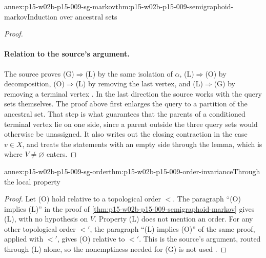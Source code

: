 \begin{annexitem}{annex:p15-w02b-p15-009-sg-markov}{thm:p15-w02b-p15-009-semigraphoid-markov}{Induction over ancestral sets}
\begin{proof}
\paragraph{Relation to the source's argument.}
The source proves (G)\(\Rightarrow\)(L) by the same isolation of
\(\alpha\), (L)\(\Rightarrow\)(O) by decomposition, (O)\(\Rightarrow\)(L)
by removing the last vertex, and (L)\(\Rightarrow\)(G) by removing a
terminal vertex \cite[Theorem~2.44 and its proof, pp.~65--66]{Lauritzen2019GraphicalLectures2020}.
In the last direction the source works with the query sets themselves.
The proof above first enlarges the query to a partition of the ancestral
set. That step is what guarantees that the parents of a conditioned
terminal vertex lie on one side, since a parent outside the three query
sets would otherwise be unassigned. It also writes out the closing
contraction in the case \(v\in X\), and treats the statements with an
empty side through the lemma, which is where \(V\neq\varnothing\) enters.
\end{proof}
\end{annexitem}

\begin{annexitem}{annex:p15-w02b-p15-009-sg-order}{thm:p15-w02b-p15-009-order-invariance}{Through the local property}
\begin{proof}
Let (O) hold relative to a topological order \(<\). The paragraph
``(O) implies (L)'' in the proof of
\cref{thm:p15-w02b-p15-009-semigraphoid-markov} gives (L), with no
hypothesis on \(V\). Property (L) does not mention an order. For any
other topological order \(<'\), the paragraph ``(L) implies (O)'' of
the same proof, applied with \(<'\), gives (O) relative to \(<'\).
This is the source's argument, routed through (L) alone, so the
nonemptiness needed for (G) is not used
\cite[Corollary~2.45, p.~66]{Lauritzen2019GraphicalLectures2020}.
\end{proof}
\end{annexitem}

